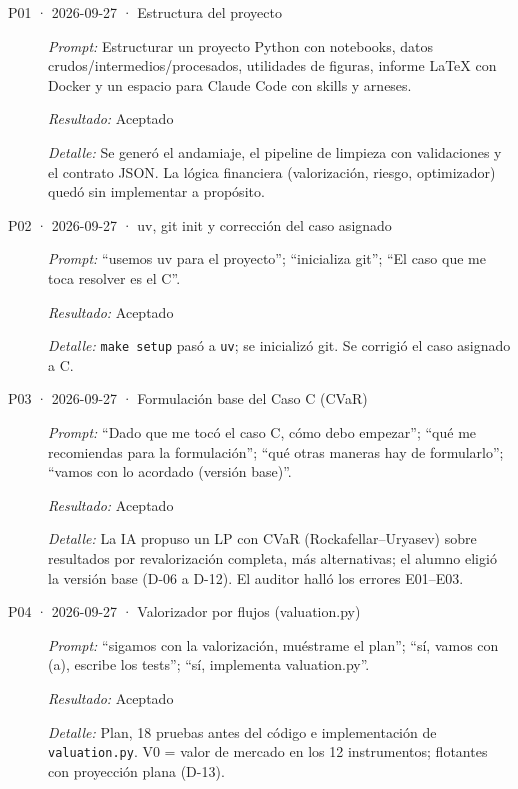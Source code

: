 \begin{description}
\item[P01 · 2026-09-27 · Estructura del proyecto] \mbox{}\par
\textit{Prompt:} Estructurar un proyecto Python con notebooks, datos crudos/intermedios/procesados, utilidades de figuras, informe LaTeX con Docker y un espacio para Claude Code con skills y arneses.\par
\textit{Resultado:} Aceptado\par
\textit{Detalle:} Se generó el andamiaje, el pipeline de limpieza con validaciones y el contrato JSON. La lógica financiera (valorización, riesgo, optimizador) quedó sin implementar a propósito.\par
\item[P02 · 2026-09-27 · uv, git init y corrección del caso asignado] \mbox{}\par
\textit{Prompt:} \enquote{usemos uv para el proyecto}; \enquote{inicializa git}; \enquote{El caso que me toca resolver es el C}.\par
\textit{Resultado:} Aceptado\par
\textit{Detalle:} \texttt{make setup} pasó a \texttt{uv}; se inicializó git. Se corrigió el caso asignado a C.\par
\item[P03 · 2026-09-27 · Formulación base del Caso C (CVaR)] \mbox{}\par
\textit{Prompt:} \enquote{Dado que me tocó el caso C, cómo debo empezar}; \enquote{qué me recomiendas para la formulación}; \enquote{qué otras maneras hay de formularlo}; \enquote{vamos con lo acordado (versión base)}.\par
\textit{Resultado:} Aceptado\par
\textit{Detalle:} La IA propuso un LP con CVaR (Rockafellar–Uryasev) sobre resultados por revalorización completa, más alternativas; el alumno eligió la versión base (D-06 a D-12). El auditor halló los errores E01–E03.\par
\item[P04 · 2026-09-27 · Valorizador por flujos (valuation.py)] \mbox{}\par
\textit{Prompt:} \enquote{sigamos con la valorización, muéstrame el plan}; \enquote{sí, vamos con (a), escribe los tests}; \enquote{sí, implementa valuation.py}.\par
\textit{Resultado:} Aceptado\par
\textit{Detalle:} Plan, 18 pruebas antes del código e implementación de \texttt{valuation.py}. V0 = valor de mercado en los 12 instrumentos; flotantes con proyección plana (D-13).\par

\end{description}
